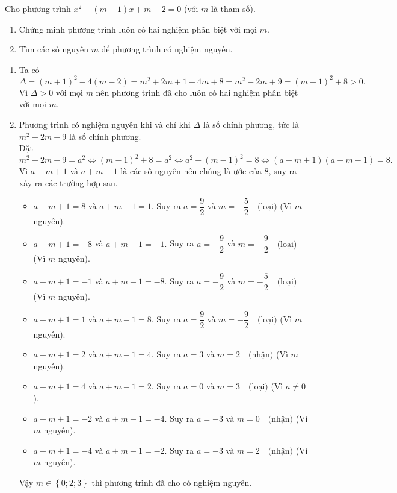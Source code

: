 \begin{ex}%
Cho phương trình $x^2 - (m+1)x +m -2 =0$ (với $m$ là tham số).
\begin{enumerate}
	\item Chứng minh phương trình luôn có hai nghiệm phân biệt với mọi $m$.
	\item Tìm các số nguyên $m$ để phương trình có nghiệm nguyên.
\end{enumerate}
	\loigiai
	{\begin{enumerate}
			\item Ta có $\Delta = (m+1)^2 - 4(m-2) = m^2 +2m +1 - 4m + 8 = m^2 -2m + 9 =(m-1)^2 + 8 > 0.$\\
			Vì $\Delta > 0$ với mọi $m$ nên phương trình đã cho luôn có hai nghiệm phân biệt với mọi $m$.
			\item Phương trình có nghiệm nguyên khi và chỉ khi $\Delta$ là số chính phương, tức là $m^2 -2m +9$ là số chính phương.\\
			Đặt $m^2 -2m+ 9 = a^2 \Leftrightarrow (m-1)^2 + 8 = a^2 \Leftrightarrow a^2 -(m-1)^2 = 8 \Leftrightarrow (a-m+1)(a+m-1)=8.$\\
			Vì $a-m +1$ và $a+ m-1$ là các số nguyên nên chúng là ước của $8$, suy ra xảy ra các trường hợp sau.
			\begin{itemize}
			\item $a-m+1 = 8$ và $a+m -1= 1.$ Suy ra $ a= \dfrac{9}{2}$ và $m = - \dfrac{5}{2}\quad \text{(loại)}$ (Vì $m$ nguyên).
				\item  $a-m+1 = -8$ và $a+m -1= -1.$ Suy ra $ a= -\dfrac{9}{2}$ và $m = - \dfrac{9}{2}\quad \text{(loại)}$ (Vì $m$ nguyên).
			\item  $a-m+1 = -1$ và $a+m -1= -8.$ Suy ra $ a= -\dfrac{9}{2}$ và $m =  -\dfrac{5}{2}\quad \text{(loại)}$ (Vì $m$ nguyên).
			\item  $a-m+1 = 1$ và $a+m -1= 8.$ Suy ra $ a= \dfrac{9}{2}$ và $m = - \dfrac{9}{2}\quad \text{(loại)}$ (Vì $m$ nguyên).
			\item  $a-m+1 = 2$ và $a+m -1= 4.$ Suy ra $ a= 3$ và $m = 2\quad \text{(nhận)}$ (Vì $m$ nguyên).
			\item  $a-m+1 = 4$ và $a+m -1= 2.$ Suy ra $ a= 0$ và $m = 3\quad \text{(loại)}$ (Vì $a\ne 0$).
			\item  $a-m+1 = -2$ và $a+m -1= -4.$ Suy ra $ a= -3$ và $m = 0\quad \text{(nhận)}$ (Vì $m$ nguyên).
			\item  $a-m+1 = -4$ và $a+m -1= -2.$ Suy ra $ a= -3$ và $m = 2\quad \text{(nhận)}$ (Vì $m$ nguyên).
				
			\end{itemize}
		Vậy $m \in \left\{ {0;2;3} \right\}$ thì phương trình đã cho có nghiệm nguyên.
			
		\end{enumerate}
	
	}
	
\end{ex}
